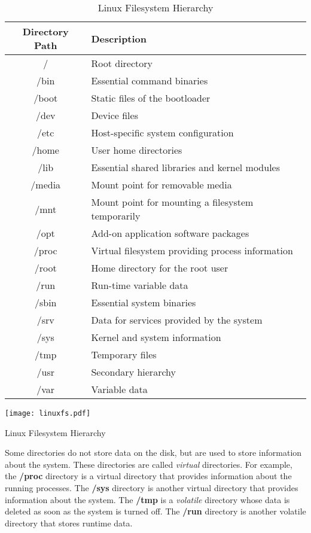 \begin{table}[h!]
\caption{Linux Filesystem Hierarchy}
\begin{tabular}{ c l }
  \toprule
 Directory Path & Description \\
 \midrule
  / & Root directory \\
  /bin & Essential command binaries \\
  /boot & Static files of the bootloader \\
  /dev & Device files \\
  /etc & Host-specific system configuration \\
  /home & User home directories \\
  /lib & Essential shared libraries and kernel modules \\
  /media & Mount point for removable media \\
  /mnt & Mount point for mounting a filesystem temporarily \\
  /opt & Add-on application software packages \\
  /proc & Virtual filesystem providing process information \\
  /root & Home directory for the root user \\
  /run & Run-time variable data \\
  /sbin & Essential system binaries \\
  /srv & Data for services provided by the system \\
  /sys & Kernel and system information \\
  /tmp & Temporary files \\
  /usr & Secondary hierarchy \\
  /var & Variable data \\
  \bottomrule
\end{tabular}
\end{table}

\begin{marginfigure}
	\texttt{[image: linuxfs.pdf]}
	\caption[Linux Filesystem Hierarchy]{Linux Filesystem Hierarchy}
\end{marginfigure}

Some directories do not store data on the disk, but are used to store information about the system.
These directories are called \textit{virtual} directories.
For example, the \textbf{/proc} directory is a virtual directory that provides information about the running processes.
The \textbf{/sys} directory is another virtual directory that provides information about the system.
The \textbf{/tmp} is a \textit{volatile} directory whose data is deleted as soon as the system is turned off.
The \textbf{/run} directory is another volatile directory that stores runtime data.

